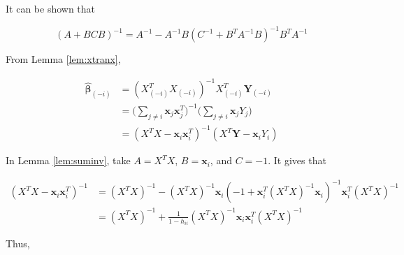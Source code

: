 \documentclass[]{book}
\theoremstyle{definition}
\theoremstyle{definition}
\theoremstyle{definition}
\theoremstyle{remark}
\let\BeginKnitrBlock\begin \let\EndKnitrBlock\end
\begin{document}
\BeginKnitrBlock{lemma}
\protect\hypertarget{lem:suminv}{}{\label{lem:suminv} }It can be shown that

\[(A + BCB)^{-1} = A^{-1} - A^{-1}B(C^{-1} + B^TA^{-1}B)^{-1}B^TA^{-1}\]
\EndKnitrBlock{lemma}

From Lemma \ref{lem:xtranx},

\begin{equation}
  \begin{split}
    \boldsymbol{\hat\beta}_{(-i)} & = (X_{(-i)}^T X_{(-i)})^{-1} X_{(-i)}^T \mathbf{Y}_{(-i)} \\
    & = \bigg(\sum_{j \neq i} \mathbf{x}_j \mathbf{x}_j^T \bigg)^{-1} \bigg( \sum_{j \neq i} \mathbf{x}_j Y_j \bigg) \\
    & = (X^TX - \mathbf{x}_i \mathbf{x}_i^T)^{-1} (X^T\mathbf{Y} - \mathbf{x}_i Y_i)
  \end{split}
  \label{eq:hbnoi}
\end{equation}

In Lemma \ref{lem:suminv}, take \(A = X^TX\), \(B = \mathbf{x}_i\), and \(C = -1\). It gives that

\begin{equation*}
  \begin{split}
    (X^TX - \mathbf{x}_i \mathbf{x}_i^T)^{-1} & = (X^TX)^{-1} - (X^TX)^{-1}\mathbf{x}_i (-1 + \mathbf{x}_i^T (X^TX)^{-1}\mathbf{x}_i )^{-1} \mathbf{x}_i^T (X^TX)^{-1} \\
    & = (X^TX)^{-1} + \frac{1}{1 - h_{ii}} (X^TX)^{-1} \mathbf{x}_i \mathbf{x}_i^T (X^TX)^{-1}
  \end{split}
\end{equation*}

Thus,
\end{document}
